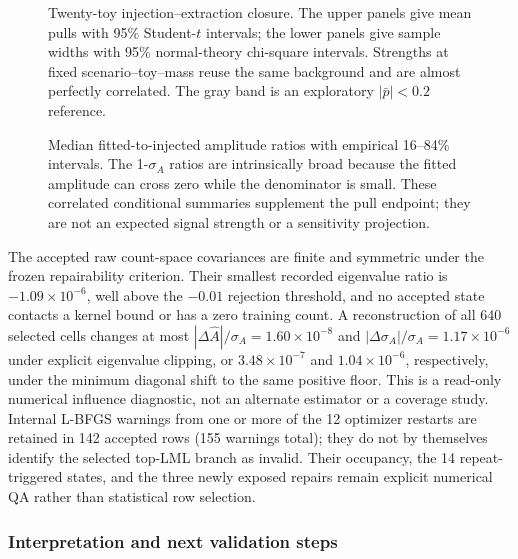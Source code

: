 \begin{figure}[p]
\centering
{}
\caption{Twenty-toy injection--extraction closure.  The upper panels give
mean pulls with 95\% Student-$t$ intervals; the lower panels give sample widths
with 95\% normal-theory chi-square intervals.  Strengths at fixed
scenario--toy--mass reuse the same background and are almost perfectly
correlated.  The gray band is an exploratory $|\bar p|<0.2$ reference.}
\label{fig:v4p7-near-threshold-injection-closure}
\end{figure}

\begin{figure}[p]
\centering
{}
\caption{Median fitted-to-injected amplitude ratios with empirical 16--84\%
intervals.  The 1-$\sigma_A$ ratios are intrinsically broad because the fitted
amplitude can cross zero while the denominator is small.  These correlated
conditional summaries supplement the pull endpoint; they are not an expected
signal strength or a sensitivity projection.}
\label{fig:v4p7-near-threshold-amplitude-recovery}
\end{figure}

The accepted raw count-space covariances are finite and symmetric under the
frozen repairability criterion.  Their smallest recorded eigenvalue ratio is
$-1.09\times10^{-6}$, well above the $-0.01$ rejection threshold, and no
accepted state contacts a kernel bound or has a zero training count.  A
reconstruction of all 640 selected cells changes at most
$|\Delta\widehat A|/\sigma_A=1.60\times10^{-8}$ and
$|\Delta\sigma_A|/\sigma_A=1.17\times10^{-6}$ under explicit eigenvalue
clipping, or $3.48\times10^{-7}$ and $1.04\times10^{-6}$, respectively,
under the minimum diagonal shift to the same positive floor.  This is a
read-only numerical influence diagnostic, not an alternate estimator or a
coverage study.  Internal
L-BFGS warnings from one or more of the 12 optimizer restarts are retained in
142 accepted rows (155 warnings total); they do not by themselves identify the
selected top-LML branch as invalid.  Their occupancy, the 14 repeat-triggered
states, and the three newly exposed repairs remain explicit numerical QA
rather than statistical row selection.

\subsubsection{Interpretation and next validation steps}

